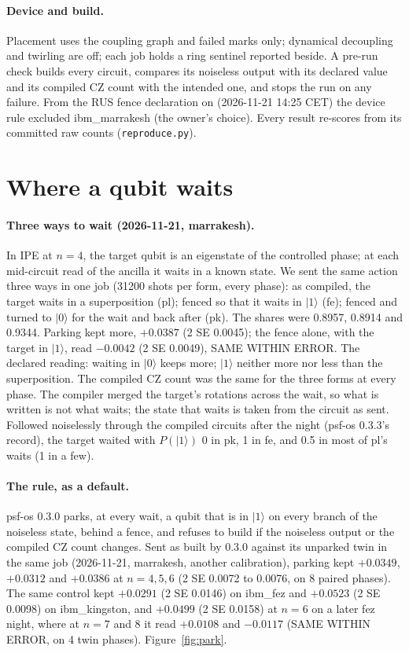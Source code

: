 \documentclass[10pt,a4paper]{article}
\newcommand{\ket}[1]{|#1\rangle}
\begin{document}
\paragraph{Device and build.} Placement uses the coupling graph and failed marks only; dynamical decoupling and
twirling are off; each job holds a ring sentinel reported beside. A pre-run check builds every circuit, compares its
noiseless output with its declared value and its compiled CZ count with the intended one, and stops the run on any
failure. From the RUS fence declaration on (2026-11-21 14:25 CET) the device rule excluded ibm\_marrakesh (the owner's choice). Every
result re-scores from its committed raw counts (\texttt{reproduce.py}).

\section{Where a qubit waits}\label{sec:park}
\paragraph{Three ways to wait (2026-11-21, marrakesh).} In IPE at $n = 4$, the target qubit is an eigenstate of the
controlled phase; at each mid-circuit read of the ancilla it waits in a known state. We sent the same action three
ways in one job (31200 shots per form, every phase): as compiled, the target waits in a superposition (pl); fenced so
that it waits in $\ket{1}$ (fe); fenced and turned to $\ket{0}$ for the wait and back after (pk). The shares were 0.8957,
0.8914 and 0.9344. Parking kept more, $+0.0387$ (2 SE 0.0045); the fence alone, with the target in $\ket{1}$, read
$-0.0042$ (2 SE 0.0049), SAME WITHIN ERROR. The declared reading: waiting in $\ket{0}$ keeps more; $\ket{1}$ neither
more nor less than the superposition. The compiled CZ count was the same for the three forms at every phase. The compiler merged the target's rotations
across the wait, so what is written is not what waits; the state that waits is taken from the circuit as sent. Followed
noiselessly through the compiled circuits after the night (psf-os 0.3.3's record), the target waited with
$P(\ket{1})$ 0 in pk, 1 in fe, and 0.5 in most of pl's waits (1 in a few).

\paragraph{The rule, as a default.} psf-os 0.3.0 parks, at every wait, a qubit that is in $\ket{1}$ on every branch of
the noiseless state, behind a fence, and refuses to build if the noiseless output or the compiled CZ count changes. Sent
as built by 0.3.0 against its unparked twin in the same job (2026-11-21, marrakesh, another calibration), parking kept
$+0.0349$, $+0.0312$ and $+0.0386$ at $n = 4, 5, 6$ (2 SE 0.0072 to 0.0076, on 8 paired phases). The same control kept
$+0.0291$ (2 SE 0.0146) on ibm\_fez and $+0.0523$ (2 SE 0.0098) on ibm\_kingston, and $+0.0499$ (2 SE 0.0158) at $n = 6$ on
a later fez night, where at $n = 7$ and 8 it read $+0.0108$ and $-0.0117$ (SAME WITHIN ERROR, on 4 twin phases).
Figure~\ref{fig:park}.
\end{document}
